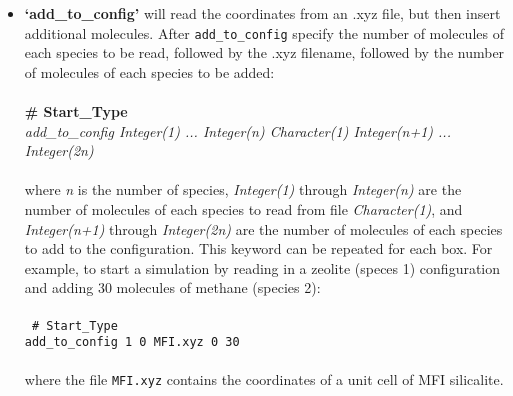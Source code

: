 \begin{itemize}
\item {\textbf{`add\_to\_config'}} will read the coordinates from an .xyz file, but then insert additional molecules.
After {\tt add\_to\_config} specify the number of molecules of each species to be read, followed by the .xyz filename, 
followed by the number of molecules of each species to be added: \\ \\
%
{\bf \# Start\_Type} \\
{\it add\_to\_config Integer(1) ... Integer(n) Character(1) Integer(n+1) ... Integer(2n)}\\ \\
%
where {\it n} is the number of species, {\it Integer(1)} through {\it Integer(n)} are the number of molecules of each
species to read from file {\it Character(1)}, and {\it Integer(n+1)} through {\it Integer(2n)} are the number of molecules
of each species to add to the configuration.
This keyword can be repeated for each box.
For example, to start a simulation by reading in a zeolite (speces 1) configuration and adding 30 molecules of methane (species 2): \\ \\
%
\texttt{
\# Start\_Type \\
add\_to\_config  1  0 MFI.xyz 0 30 \\} \\
%
where the file \texttt{MFI.xyz} contains the coordinates of a unit cell of MFI silicalite.


\end{itemize}

